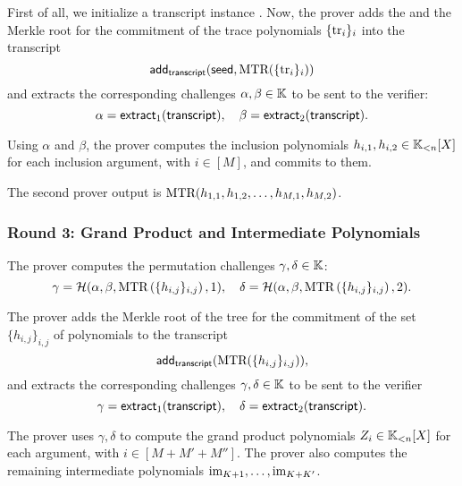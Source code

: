 \ifPOLYGON
First of all, we initialize a transcript instance \transcript. Now, the prover adds the \seed and the Merkle root for the commitment of the trace polynomials $\{\text{tr}_i\}_i$ into the transcript
\[
	\textsf{add}_{\textsf{transcript}}(\textsf{seed}, \text{MTR}(\{\text{tr}_i\}_i))
\]
and extracts the corresponding challenges $\alpha, \beta \in \mathbb{K}$ to be sent to the verifier:
\[
\alpha = \mathsf{extract}_{1}(\textsf{transcript}), \quad \beta = \mathsf{extract}_{2}(\textsf{transcript}).
\]
\fi

Using $\alpha$ and $\beta$, the prover computes the inclusion polynomials $h_{i,1},h_{i,2} \in \mathbb{K}_{<n}[X]$ for each inclusion argument, with $i \in [M]$, and commits to them.

The second prover output is $\text{MTR}(h_{1,1},h_{1,2}, \dots, h_{M,1},h_{M,2})$.


\subsubsection*{Round 3: Grand Product and Intermediate Polynomials}\label{par:round-3}

\ifNOPOLYGON
The prover computes the permutation challenges $\gamma,\delta \in \mathbb{K}$: 
\[
  \gamma = \mathcal{H}(\alpha,\beta,\text{MTR}\left(\{h_{i,j}\}_{i,j}\right),1),\quad \delta = \mathcal{H}(\alpha,\beta,\text{MTR}\left(\{h_{i,j}\}_{i,j}\right),2).
\]
\fi

\ifPOLYGON
The prover adds the Merkle root of the tree for the commitment of the set $\{h_{i, j}\}_{i, j}$ of polynomials to the transcript
\[
\textsf{add}_{\textsf{transcript}}(\text{MTR}(\{h_{i, j}\}_{i, j})),
\]
and extracts the corresponding challenges $\gamma, \delta \in \mathbb{K}$ to be sent to the verifier
\[
\gamma = \mathsf{extract}_{1}(\textsf{transcript}), \quad \delta = \mathsf{extract}_{2}(\textsf{transcript}).
\]
\fi

The prover uses $\gamma,\delta$ to compute the grand product polynomials $Z_i \in \mathbb{K}_{<n}[X]$ for each argument, with $i \in [M+M'+M'']$. 
The prover also computes the remaining intermediate polynomials $\text{im}_{K+1},\dots,\text{im}_{K+K'}$. 

